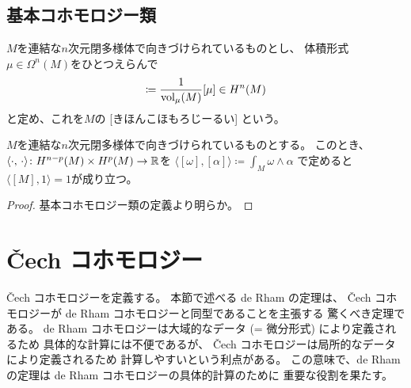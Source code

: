 \documentclass[report]{jlreq}
\begin{document}
\subsection{基本コホモロジー類}

\begin{definition}[基本コホモロジー類]
    $M$を連結な$n$次元閉多様体で向きづけられているものとし、
    体積形式$\mu \in \Omega^n(M)$をひとつえらんで
    \begin{equation}
        [M] \coloneqq \frac{1}{\vol_\mu(M)} [\mu] \in H^n(M)
    \end{equation}
    と定め、これを$M$の
    [きほんこほもろじーるい]
    という。
\end{definition}

\begin{lemma}
    $M$を連結な$n$次元閉多様体で向きづけられているものとする。
    このとき、
    $\langle \cdot, \, \cdot \rangle \colon H^{n - p}(M) \times H^p(M) \to \mathbb{R}$を
    $\langle [\omega], [\alpha] \rangle \coloneqq \int_M \omega \wedge \alpha$
    で定めると
    $\langle [M], 1 \rangle = 1$が成り立つ。
\end{lemma}

\begin{proof}
    基本コホモロジー類の定義より明らか。
\end{proof}

%
\section{\v{C}ech コホモロジー}

\v{C}ech コホモロジーを定義する。
本節で述べる de Rham の定理は、
\v{C}ech コホモロジーが de Rham コホモロジーと同型であることを主張する
驚くべき定理である。
de Rham コホモロジーは大域的なデータ (= 微分形式) により定義されるため
具体的な計算には不便であるが、
\v{C}ech コホモロジーは局所的なデータにより定義されるため
計算しやすいという利点がある。
この意味で、de Rham の定理は de Rham コホモロジーの具体的計算のために
重要な役割を果たす。
\end{document}
